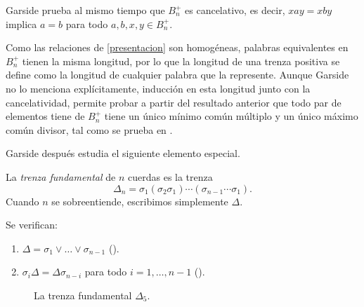 \documentclass[TFG.tex]{subfiles}
\begin{document}
Garside prueba al mismo tiempo que $B_n^+$ es cancelativo, es decir, $xay=xby$ implica $a=b$ para todo $a,b,x,y\in B_n^+$.

Como las relaciones de \ref{presentacion} son homogéneas, palabras equivalentes en $B_n^+$ tienen la misma longitud, por lo que la longitud de una trenza positiva se define como la longitud de cualquier palabra que la represente. Aunque Garside no lo menciona explícitamente, inducción en esta longitud junto con la cancelatividad, permite probar a partir del resultado anterior que todo par de elementos tiene de $B_n^+$ tiene un único mínimo común múltiplo y un único máximo común divisor, tal como se prueba en \cite{Dehornoy}. 

Garside después estudia el siguiente elemento especial.
\begin{defi}
La \emph{trenza fundamental} de $n$ cuerdas es la trenza
$$\Delta_n=\sigma_1(\sigma_2\sigma_1)\cdots(\sigma_{n-1}\cdots\sigma_1).$$
Cuando $n$ se sobreentiende, escribimos simplemente $\Delta$. 
\end{defi} 
\newpage
\begin{prop}\label{conjuga}
Se verifican: 
\begin{enumerate}
\item $\Delta=\sigma_1\lor\dots\lor\sigma_{n-1}$ (\cite[Lema 1]{Garside}).
\item $\sigma_i\Delta=\Delta\sigma_{n-i}$ para todo $i=1,\dots, n-1$ (\cite[Lema 4]{Garside}).
\end{enumerate}
\end{prop} 


\begin{figure}[h!]
\centering
{}
\caption{La trenza fundamental $\Delta_5$.}
\end{figure}
\end{document}
